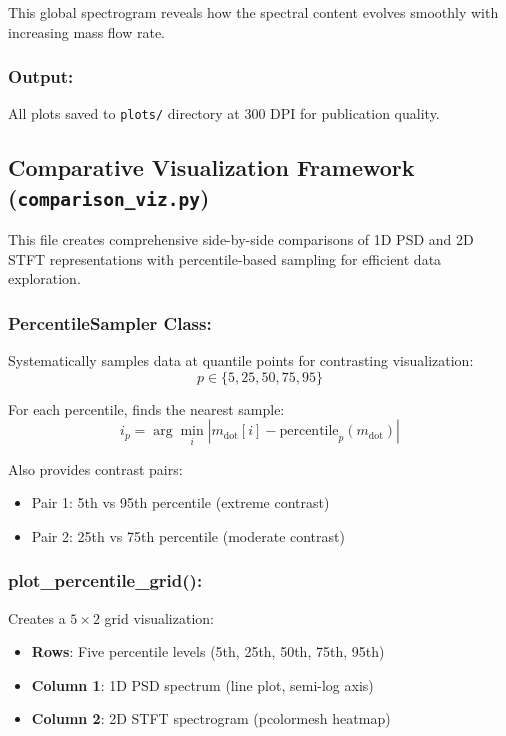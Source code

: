 This global spectrogram reveals how the spectral content evolves smoothly with increasing mass flow rate.

\subsubsection{Output:}
All plots saved to \verb|plots/| directory at 300 DPI for publication quality.

\subsection{Comparative Visualization Framework (\texttt{comparison\_viz.py})}

This file creates comprehensive side-by-side comparisons of 1D PSD and 2D STFT representations 
with percentile-based sampling for efficient data exploration.

\subsubsection{PercentileSampler Class:}

Systematically samples data at quantile points for contrasting visualization:
\begin{equation}\label{percentiles}
    p \in \{5, 25, 50, 75, 95\}
\end{equation}

For each percentile, finds the nearest sample:
\begin{equation}\label{percentile_sample}
    i_p = \arg\min_i |m_{\text{dot}}[i] - \text{percentile}_p(m_{\text{dot}})|
\end{equation}

Also provides contrast pairs:
\begin{itemize}
    \item Pair 1: 5th vs 95th percentile (extreme contrast)
    \item Pair 2: 25th vs 75th percentile (moderate contrast)
\end{itemize}

\subsubsection{plot\_percentile\_grid():}

Creates a $5 \times 2$ grid visualization:
\begin{itemize}
    \item \textbf{Rows}: Five percentile levels (5th, 25th, 50th, 75th, 95th)
    \item \textbf{Column 1}: 1D PSD spectrum (line plot, semi-log axis)
    \item \textbf{Column 2}: 2D STFT spectrogram (pcolormesh heatmap)
\end{itemize}

